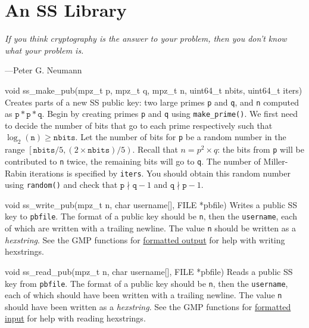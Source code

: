 \section{An SS Library}
\epigraph{\emph{If you think cryptography is the answer to your problem, then you don't know what your problem is.}}{---Peter G.\xspace Neumann}

\noindent
\begin{funcdoc}{void ss\_make\_pub(mpz\_t p, mpz\_t q, mpz\_t n, uint64\_t nbits,
  uint64\_t iters)}
  Creates parts of a new SS public key: two large primes \texttt{p} and
  \texttt{q}, and \texttt{n} computed as $\texttt{p} * \texttt{p} * \texttt{q}$.
  Begin by creating primes \texttt{p} and \texttt{q} using \texttt{make\_prime()}.
  We first need to decide the number of bits that go to each prime
  respectively such that $\log_2(\texttt{n}) \ge \texttt{nbits}$. Let the
  number of bits for \texttt{p} be a random number in the range $\left
  [\texttt{nbits}/{5}, (2 \times \texttt{nbits})/{5} \right )$. Recall that $n
  = p^2 \times q$: the bits from \texttt{p} will be contributed to \texttt{n}
  twice, the remaining bits will go to \texttt{q}. The number of Miller-Rabin
  iterations is specified by \texttt{iters}. You should obtain this random
  number using \texttt{random()} and check that $\texttt{p} \nmid \texttt{q} -
  1$ and $\texttt{q} \nmid \texttt{p} - 1$.
\end{funcdoc}

\begin{funcdoc}{void ss\_write\_pub(mpz\_t n, char username[], FILE *pbfile)}
  Writes a public SS key to \texttt{pbfile}. The format of a public key
  should be \texttt{n}, then the
  \texttt{username}, each of which are written with a trailing newline.
  The value \texttt{n} should be written as
  a \emph{hexstring}. See the GMP functions for
  \href{https://gmplib.org/manual/Formatted-Output-Functions}{formatted
  output} for help with writing hexstrings.
\end{funcdoc}

\begin{funcdoc}{void ss\_read\_pub(mpz\_t n,
char username[], FILE *pbfile)}
  Reads a public SS key from \texttt{pbfile}. The format of a public
  key should be \texttt{n}, then the
  \texttt{username}, each of which should have been written with a
  trailing newline. The value \texttt{n}
  should have been written as a \emph{hexstring}. See the GMP functions
  for
  \href{https://gmplib.org/manual/Formatted-Input-Functions}{formatted
  input} for help with reading hexstrings.
\end{funcdoc}

